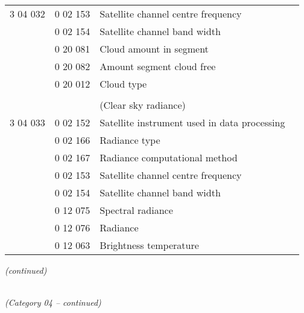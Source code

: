 \begin{longtable}[]{@{}llll@{}}
3 04 032 & 0 02 153 & Satellite channel centre frequency &\tabularnewline
& 0 02 154 & Satellite channel band width &\tabularnewline
& 0 20 081 & Cloud amount in segment &\tabularnewline
& 0 20 082 & Amount segment cloud free &\tabularnewline
& 0 20 012 & Cloud type &\tabularnewline
& & &\tabularnewline
& & (Clear sky radiance) &\tabularnewline
3 04 033 & 0 02 152 & Satellite instrument used in data processing &\tabularnewline
& 0 02 166 & Radiance type &\tabularnewline
& 0 02 167 & Radiance computational method &\tabularnewline
& 0 02 153 & Satellite channel centre frequency &\tabularnewline
& 0 02 154 & Satellite channel band width &\tabularnewline
& 0 12 075 & Spectral radiance &\tabularnewline
& 0 12 076 & Radiance &\tabularnewline
& 0 12 063 & Brightness temperature &\tabularnewline
\bottomrule
\end{longtable}

\emph{(continued)}

\emph{\\
(Category 04 -- continued)}

